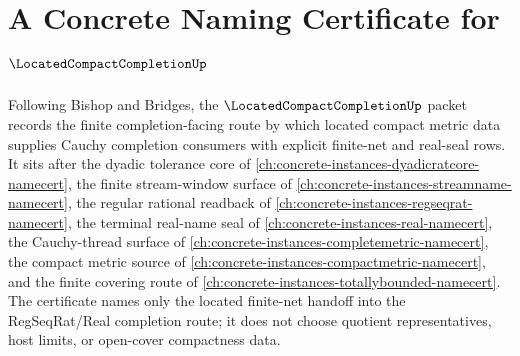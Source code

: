 \chapter{A Concrete Naming Certificate for $\LocatedCompactCompletionUp$}
\label{ch:concrete-instances-located-compact-completion-namecert}

Following Bishop and Bridges, the $\LocatedCompactCompletionUp$ packet records the finite completion-facing route by which located compact metric data supplies Cauchy completion consumers with explicit finite-net and real-seal rows. It sits after the dyadic tolerance core of \autoref{ch:concrete-instances-dyadicratcore-namecert}, the finite stream-window surface of \autoref{ch:concrete-instances-streamname-namecert}, the regular rational readback of \autoref{ch:concrete-instances-regseqrat-namecert}, the terminal real-name seal of \autoref{ch:concrete-instances-real-namecert}, the Cauchy-thread surface of \autoref{ch:concrete-instances-completemetric-namecert}, the compact metric source of \autoref{ch:concrete-instances-compactmetric-namecert}, and the finite covering route of \autoref{ch:concrete-instances-totallybounded-namecert}. The certificate names only the located finite-net handoff into the RegSeqRat/Real completion route; it does not choose quotient representatives, host limits, or open-cover compactness data.

